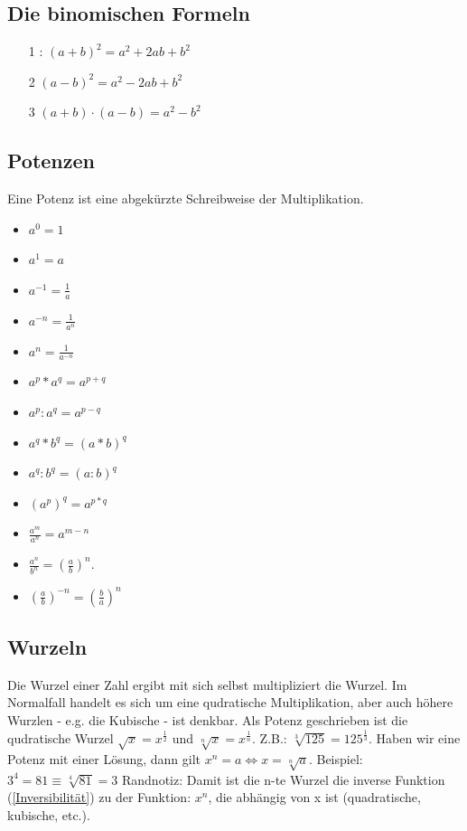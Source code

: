 \documentclass[letterpaper, titlepage]{article}
\begin{document}
\subsection{Die binomischen Formeln}
\begin{enumerate}
    \item[1]: $(a+b)^2=a^2+2ab+b^2$
    \item[2] $(a-b)^2=a^2-2ab+b^2$
    \item[3]  $(a+b)\cdot(a-b)=a^2-b^2$
\end{enumerate}

\subsection{Potenzen}\label{Potenzen}
Eine Potenz ist eine abgekürzte Schreibweise der Multiplikation.
\begin{itemize}
    \item $a^0=1$
    \item $a^1=a$
    \item $a^{-1}=\frac{1}{a}$ 
    \item $a^{-n}=\frac{1}{a^n}$
    \item $a^n=\frac{1}{a^{-n}}$
    \item $a^p * a^q = a^{p+q}$
    \item $a^p : a^q = a^{p-q}$
    \item $a^q * b^q = (a * b)^q$
    \item $a^q : b^q = (a : b)^q$
    \item $(a^p)^q = a^{p*q}$
    \item $\frac{a^m}{a^n}=a^{m-n}$
    \item $\frac{a^n}{b^n}=(\frac{a}{b})^n$.
    \item $(\frac{a}{b})^{-n}=(\frac{b}{a})^n$ 
\end{itemize}

\subsection{Wurzeln}\label{Wurzeln}
Die Wurzel einer Zahl ergibt mit sich selbst multipliziert die Wurzel. Im Normalfall handelt es sich um eine qudratische Multiplikation, aber auch höhere Wurzlen - e.g. die Kubische - ist denkbar. Als Potenz geschrieben ist die qudratische Wurzel $\sqrt{x}=x^{\frac{1}{2}}$ und $\sqrt[n]{x}=x^{\frac{1}{n}}$. Z.B.: $\sqrt[3]{125} = 125^{\frac{1}{3}}$.
Haben wir eine Potenz mit einer Lösung, dann gilt $x^n=a \Leftrightarrow x=\sqrt[n]{a}$.
\skiptwolines
Beispiel: $3^4 = 81 \equiv \sqrt[4]{81} = 3$
\skiptwolines
Randnotiz: Damit ist die n-te Wurzel die inverse Funktion (\ref{Inversibilität}) zu der Funktion: $x^n$, die abhängig von x ist (quadratische, kubische, etc.).
\end{document}
